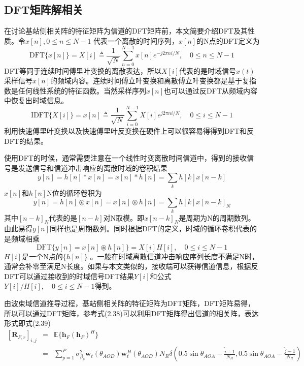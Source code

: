 \documentclass[bachelor,nocolorlinks, printoneside]{seuthesis} %
\begin{document}
\begin{Main}
\subsection{DFT矩阵解相关}
在讨论基站侧相关阵的特征矩阵为信道的DFT矩阵前，本文简要介绍DFT及其性质。令$x[n],0 \leq n \leq N-1$ 代表一个离散的时间序列，$x[n]$的N点的DFT定义为
\begin{equation}\label{key}
\mathrm{DFT} \lbrace x[n] \rbrace = X[i] \triangleq \frac{1}{\sqrt{N}} \sum_{n=0}^{N-1}x[n]e^{-j2\pi ni/N},\quad 0 \leq n \leq N-1
\end{equation}
DFT等同于连续时间傅里叶变换的离散表达，所以$X[i]$代表的是时域信号$x(t)$采样信号$x[n]$的频域内容。连续时间傅立叶变换和离散傅立叶变换都是基于复指数是任何线性系统的特征函数。当然采样序列$x[n]$也可以通过反DFT从频域内容中恢复出时域信息。
\begin{equation}\label{key}
\mathrm{IDFT} \lbrace X[i] \rbrace = x[n] \triangleq \frac{1}{\sqrt{N}} \sum_{i=0}^{N-1}X[i]e^{j2\pi ni/N},\quad 0 \leq i \leq N-1
\end{equation}
利用快速傅里叶变换以及快速傅里叶反变换在硬件上可以很容易得得到DFT和反DFT的结果。

使用DFT的时候，通常需要注意在一个线性时变离散时间信道中，得到的接收信号是发送信号和信道冲击响应的离散时域的卷积结果
\begin{equation}\label{key}
y[n] = h[n]*x[n] = x[n] * h[n] = \sum_{k} h[k]x[n-k]
\end{equation}
$x[n]$和$h[n]$N位的循环卷积为
\begin{equation}\label{key}
y[n] = h[n] \circledast x[n] = x[n] \circledast h[n] = \sum_{k} h[k]x[n-k]_N
\end{equation}
其中$[n-k]_N$代表的是$[n-k]$对N取模。即$x[n-k]_N$是周期为N的周期数列。由此易得$y[n]$同样也是周期数列。同时根据DFT的定义，时域的循环卷积代表的是频域相乘
\begin{equation}\label{key}
\mathrm{DFT} \lbrace y[n]=x[n] \circledast h[n] \rbrace = X[i]H[i], \quad 0 \leq i \leq N-1
\end{equation}
$H[i]$是一个N点的$\lbrace h[n] \rbrace$ 。一般在时域离散信道冲击响应序列长度不满足N时，通常会补零至满足N长度。如果与本文类似的，接收端可以获得信道信息，根据反DFT可以通过接收到的时域信号DFT结果$Y[i]$和公式$Y[i]/H[i],\quad 0 \leq i \leq N-1$得到。

由波束域信道推导过程，基站侧相关阵的特征矩阵为DFT矩阵，DFT矩阵易得，所以可以通过DFT矩阵，参考式(2.38)可以利用DFT矩阵得出信道的相关阵，表达形式即式(2.39)
\begin{eqnarray}\label{key}
[ \mathbf{R}_{F,r} ]_{i,j} & = &\mathbb{E} \lbrace \mathbf{h}_{F} (\mathbf{h}_{F})^{H} \rbrace  \nonumber \\
& = & \sum_{p=1}^{P} \sigma_{\beta_p}^{2} \mathbf{w}_{t}(\theta_{AOD}) \mathbf{w}_{t}^{H}(\theta_{AOD}) N_R \delta \left( 0.5\sin \theta_{AOA} - \frac{\tilde{i}-1}{N_R} , 0.5\sin \theta_{AOA} - \frac{\tilde{j}-1}{N_R} \right) \nonumber
\end{eqnarray}


\end{Main}
\end{document}
